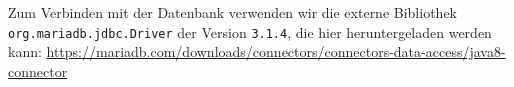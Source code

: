 \documentclass[
	12pt,
	a4paper,
	hidelinks
	]{report}
\newcommand{\code}[1]{\texttt{#1}}
\begin{document}
Zum Verbinden mit der Datenbank verwenden wir die externe Bibliothek \\
 \code{org.mariadb.jdbc.Driver} der Version \code{3.1.4}, die hier heruntergeladen werden kann: \url{https://mariadb.com/downloads/connectors/connectors-data-access/java8-connector}
 \begin{figure}[!h]
\end{figure}


\newpage
{}
	\printacronyms[template=supertabular]
\end{document}

